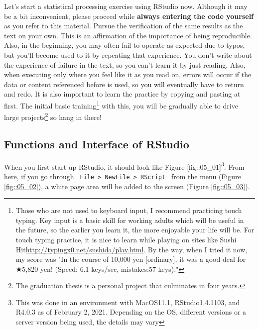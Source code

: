 \documentclass{ltjsbook}
\begin{document}
Let's start a statistical processing exercise using RStudio now. Although it may be a bit inconvenient, please proceed while \textbf{always entering the code yourself} as you refer to this material. Pursue the verification of the same results as the text on your own. This is an affirmation of the importance of being reproducible. Also,  in the beginning, you may often fail to operate as expected due to typos, but you'll become used to it by repeating that experience. You don't write about the experience of failure in the text, so you can't learn it by just reading. Also, when executing only where you feel like it as you read on, errors will occur if the data or content referenced before is used, so you will eventually have to return and redo. It is also important to learn the practice by copying and pasting at first. The initial basic training\footnote{Those who are not used to keyboard input, I recommend practicing touch typing. Key input is a basic skill for working adults which will be useful in the future, so the earlier you learn it, the more enjoyable your life will be. For touch typing practice, it is nice to learn while playing on sites like Sushi Hit\url{http://typingx0.net/sushida/play.html}. By the way, when I tried it now, my score was "In the course of 10,000 yen [ordinary], it was a good deal for ★5,820 yen! (Speed: 6.1 keys/sec, mistakes:57 keys)."} with this, you will be gradually able to drive large projects\footnote{The graduation thesis is a personal project that culminates in four years.} so hang in there!


\subsection{Functions and Interface of RStudio}
When you first start up RStudio, it should look like Figure \ref{fig::05_01}\footnote{This was done in an environment with MacOS11.1, RStudio1.4.1103, and R4.0.3 as of February 2, 2021. Depending on the OS, different versions or a server version being used, the details may vary}. From here, if you go through \verb| File > NewFile > RScript | from the menu (Figure \ref{fig::05_02}), a white page area will be added to the screen (Figure \ref{fig::05_03}).
\end{document}
